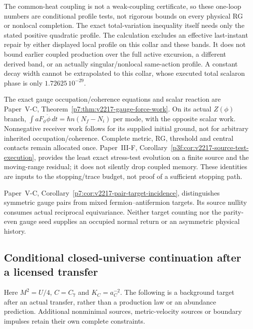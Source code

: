 \documentclass[12pt,a4paper]{article}
\begin{document}
The common-heat coupling is not a weak-coupling certificate, so these
one-loop numbers are conditional profile tests, not rigorous bounds on
every physical RG or nonlocal completion.  The exact total-variation
inequality itself needs only the stated positive quadratic profile.
The calculation excludes an effective last-instant repair by either
displayed local profile on this collar and these bands.  It does not
bound earlier coupled production over the full active excursion, a
different derived band, or an actually singular/nonlocal same-action
profile.  A constant decay width cannot be extrapolated to this collar,
whose executed total scalaron phase is only
$1.72625\,10^{-29}$.

\begin{remark}
\label{p8:rem:v2217-gauge-work-budget}
The exact gauge occupation/coherence equations and scalar reaction are
Paper~V-C, Theorem~\ref{p7:thm:v2217-gauge-force-work}. On its actual
$Z(\phi)$ branch, $\int aF_\phi\dot\phi\,dt=\hbar n(N_f-N_i)$ per mode,
with the opposite scalar work. Nonnegative receiver work follows for its
supplied initial ground, not for arbitrary inherited occupation/coherence.
Complete metric, RG, threshold and central contacts remain allocated once.
Paper~III-F, Corollary~\ref{p3f:cor:v2217-source-test-execution}, provides
the least exact stress-test evolution on a finite source and the moving-range
residual; it does not silently drop coupled memory. These identities are
inputs to the stopping/trace budget, not proof of a sufficient stopping path.
\end{remark}
\begin{remark}
\label{p8:rem:v2217-pair-target-scope}
Paper~V-C, Corollary~\ref{p7:cor:v2217-pair-target-incidence}, distinguishes
symmetric gauge pairs from mixed fermion--antifermion targets. Its source
nullity consumes actual reciprocal equivariance. Neither target counting nor
the parity-even gauge seed supplies an occupied normal return or an
asymmetric physical history.
\end{remark}


\subsection{Conditional closed-universe continuation after a licensed transfer}
\label{p8:sec:v2216-terminal-continuation}
Here $M^2=U/4$, $C=C_7$ and $K_C=a_C^{-2}$.  The following is a
background target after an actual transfer, rather than a production
law or an abundance prediction.  Additional nonminimal sources,
metric-velocity sources or boundary impulses retain their own complete
constraints.
\end{document}
